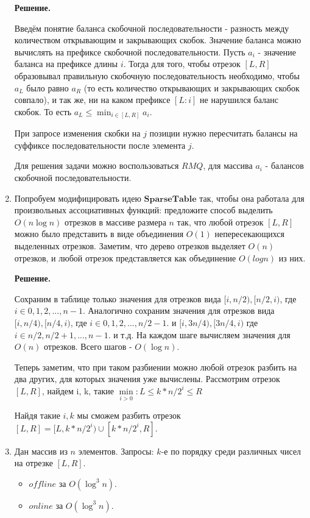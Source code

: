 \begin{enumerate}
	\textbf{Решение.}
	
	Введём понятие баланса скобочной последовательности - разность между количеством 
	открывающим и закрывающих скобок. Значение баланса можно вычислять на префиксе скобочной 
	последовательности. Пусть $a_i$ - значение баланса на префиксе длины $i$. Тогда для того, 
	чтобы отрезок $[L, R]$ образовывал правильную скобочную последовательность необходимо, 
	чтобы $a_L$ было равно $a_R$ (то есть количество открывающих и закрывающих скобок совпало), 
	и так же, ни на каком префиксе $[L:i]$ не нарушился баланс скобок. То есть $a_L \leqslant 
	\min_{i\in[L, R]} a_i$.
	
	При запросе изменения скобки на $j$ позиции нужно пересчитать балансы на суффиксе 
	последовательности после элемента $j$.
	
	Для решения задачи можно воспользоваться $RMQ$, для массива $a_i$ - балансов скобочной 
	последовательности.
	
	\item Попробуем модифицировать идею $\mathbf{SparseTable}$ так, чтобы она работала для 
	произвольных ассоциативных функций: предложите способ выделить $O(n \log n)$ отрезков в 
	массиве размера $n$ так, что любой отрезок $[L, R]$ можно было представить в виде 
	объединения $O(1)$ непересекающихся выделенных отрезков. Заметим, что дерево отрезков 
	выделяет $O(n)$ отрезков, и любой отрезок представляется как объединение $O(log n)$ из них.
	
	\textbf{Решение.}
	
	Сохраним в таблице только значения для отрезков вида $[i, n/2), [n/2, i)$, где $i\in 0, 1, 
	2,..., n - 1$. Аналогично сохраним значения для отрезков вида $[i, n/4), [n/4, i)$, где 
	$i\in 0, 1, 2,..., n/2 - 1$. и $[i, 3n/4), [3n/4, i)$ где $i\in n/2, n/2 + 1,..., n - 1$.
	и т.д. На каждом шаге вычисляем значения для $O(n)$ отрезков. Всего шагов - $O(\log n)$.
	
	Теперь заметим, что при таком разбиении можно любой отрезок разбить на два других, для 
	которых значения уже вычислены. Рассмотрим отрезок $[L, R]$, найдем i, k, такие 
	$\min\limits_{i > 0} : L\leqslant k*n/2^i \leqslant R$
	
	Найдя такие $i, k$ мы сможем разбить отрезок $[L,R] = [L, k*n/2^i) \cup [k*n/2^i, R]$. 
	
	\item Дан массив из $n$ элементов. Запросы: $k$-е по порядку среди различных чисел на отрезке $[L, R]$.
	\begin{itemize}
		\item $offline$ за $O(\log^3 n)$.
		\item $online$ за $O(\log^3 n)$.
	\end{itemize}
	

\end{enumerate}
